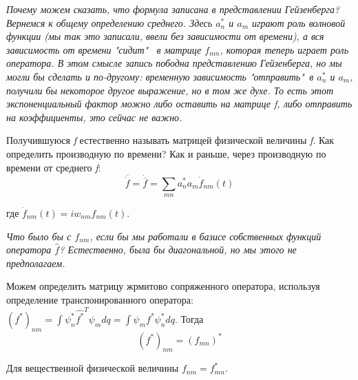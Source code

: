\begin{remark}
\par \textit{Почему можем сказать, что формула записана в представлении Гейзенберга? Вернемся к общему определению среднего. Здесь $a^*_n$ и $ a_m$ играют роль волновой функции (мы так это записали, ввели без зависимости от времени), а вся зависимость от времени "сидит" \, в матрице $f_{nm}$, которая теперь играет роль оператора. В этом смысле запись пободна представлению Гейзенберга, но мы могли бы сделать и по-другому: временную зависимость "отправить"\, в $a^*_n$ и $ a_m$, получили бы некоторое другое выражение, но в том же духе. То есть этот экспоненциальный фактор можно либо оставить на матрице f, либо отправить на коэффициенты, это сейчас не важно.}
\end{remark}
\par Получившуюся \textit{f} естественно называть матрицей физической величины \textit{f}. Как определить производную по времени? Как и раньше, через производную по времени от среднего \textit{f}:
$$\overline{{\dot{f}}} = \dot{\overline{f}} = \sum_{mn} a^*_n a_m \dot{f}_{nm}(t) $$
\par где $\dot{f}_{nm}(t) = i w_{nm} f_{nm}(t)$. 
\begin{remark}
\par \textit{Что было бы с $f_{nm}$, если бы мы работали в базисе собственных функций оператора $\hat{f}$? Естественно, была бы диагональной, но мы этого не предполагаем.}
\end{remark}
\par Можем определить матрицу жрмитово сопряженного оператора, используя определение транспонированного оператора: $(f^*)_{nm} = \int \psi^*_n \hat{f^*}^T \psi_m dq = \int \psi_m f^* \psi^*_n dq$. Тогда
$$(f^*)_{nm}=(f_{mn})^*$$
\par Для вещественной физической величины $f_{nm}=f^*_{mn}$.
